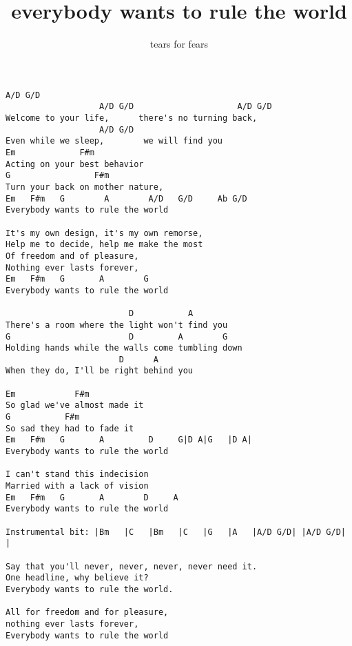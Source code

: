 \author{tears for fears}
\title{everybody wants to rule the world}
\maketitle
\begin{verbatim}
A/D G/D
                   A/D G/D                     A/D G/D
Welcome to your life,      there's no turning back,
                   A/D G/D
Even while we sleep,        we will find you
Em             F#m
Acting on your best behavior
G                 F#m
Turn your back on mother nature,
Em   F#m   G        A        A/D   G/D     Ab G/D
Everybody wants to rule the world

It's my own design, it's my own remorse,
Help me to decide, help me make the most
Of freedom and of pleasure,
Nothing ever lasts forever,
Em   F#m   G       A        G
Everybody wants to rule the world

                         D           A
There's a room where the light won't find you
G                        D         A        G
Holding hands while the walls come tumbling down
                       D      A
When they do, I'll be right behind you

Em            F#m
So glad we've almost made it
G           F#m
So sad they had to fade it
Em   F#m   G       A         D     G|D A|G   |D A|
Everybody wants to rule the world

I can't stand this indecision
Married with a lack of vision
Em   F#m   G       A        D     A
Everybody wants to rule the world

Instrumental bit: |Bm   |C   |Bm   |C   |G   |A   |A/D G/D| |A/D G/D|  |

Say that you'll never, never, never, never need it.
One headline, why believe it?
Everybody wants to rule the world.

All for freedom and for pleasure,
nothing ever lasts forever,
Everybody wants to rule the world

\end{verbatim}
